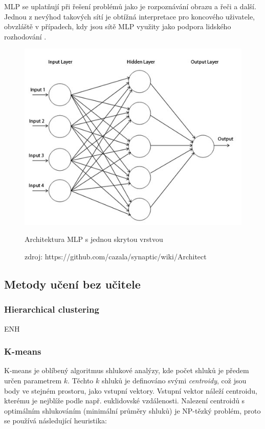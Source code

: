\documentclass[thesis=M,czech]{FITthesis}[2012/06/26]
\begin{document}
MLP se uplatňují při řešení problémů jako je rozpoznávání obrazu a řeči a další. Jednou z nevýhod takových sítí je obtížná interpretace pro koncového uživatele, obvzláště v případech, kdy jsou sítě MLP využity jako podpora lidského rozhodování \cite{needed}. 



\begin{figure}[htbp]
\begin{center}
	\includegraphics[scale=0.4]{mlp.jpeg}
\caption{Architektura MLP s jednou skrytou vrstvou}
\label{fig:mlp}
\end{center}
  \caption*{zdroj: https://github.com/cazala/synaptic/wiki/Architect}
\end{figure}

 
 \subsection{Metody učení bez učitele}
  \subsubsection*{Hierarchical clustering}
  ENH
  \subsubsection*{K-means}

K-means je oblíbený algoritmus shlukové analýzy, kde počet shluků je předem určen parametrem $k$. Těchto $k$ shluků je definováno svými \textit{centroidy}, což jsou body ve stejném prostoru, jako vstupní vektory. Vstupní vektor náleží centroidu, kterému je nejblíže podle např. euklidovské vzdálenosti. Nalezení centroidů s optimálním shlukováním (minimální průměry shluků) je NP-tězký problém\cite{k-means-nphard}, proto se  používá následující heuristika\cite{k-means-algo}:
\end{document}
